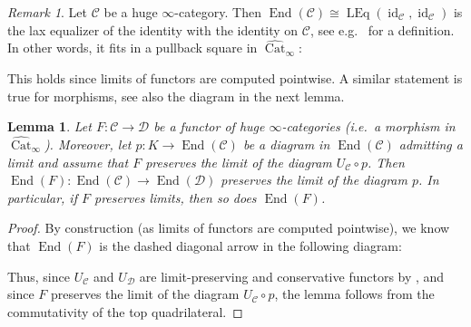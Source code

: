 \documentclass{article}
\theoremstyle{definition}
\theoremstyle{definition}
\theoremstyle{definition}
\theoremstyle{plain}
\newtheorem{lem}[defn]{Lemma}
\theoremstyle{plain}
\theoremstyle{plain}
\theoremstyle{plain}
\theoremstyle{plain}
\theoremstyle{plain}
\theoremstyle{plain}
\theoremstyle{plain}
\theoremstyle{remark}
\newtheorem{rmk}[defn]{Remark}
\theoremstyle{remark}
\theoremstyle{plain}
\theoremstyle{plain}
\theoremstyle{plain}
\theoremstyle{plain}
\theoremstyle{plain}
\newcommand{\id}[1]{\operatorname{id}_{#1}}
\newcommand{\cartsymb}{\arrow[dr, phantom,"\scalebox{1.5}{\color{black}$\lrcorner$}", near start, color=black]}
\newcommand{\Leq}[2]{\operatorname{LEq}(#1,#2)}
\newcommand{\End}[1]{\operatorname{End}(#1)}
\newcommand{\Cat}[1]{\mathcal{#1}}
\newcommand{\Fun}[2]{\operatorname{Fun}({#1},{#2})}
\newcommand{\CatInfHuge}{\widehat{\operatorname{Cat}}_{\infty}}
\begin{document}
\begin{rmk}
    Let $\Cat C$ be a huge $\infty$-category.
    Then $\End{\Cat C} \cong \Leq{\id{\Cat C}}{\id{\Cat C}}$ is
    the lax equalizer of the identity with the identity on $\Cat C$, see e.g.\ \cite[Definition 2.1]{cartmod} for a definition.
    In other words, it fits in a pullback square in $\CatInfHuge$:
    \begin{center}
    \end{center}
    This holds since limits of functors are computed pointwise.
    A similar statement is true for morphisms, see also the diagram in the next lemma.
\end{rmk}

\begin{lem} \label{lem:functoriality:end-limit-preserving}
    Let $F \colon \Cat C \to \Cat D$ be a functor of huge $\infty$-categories (i.e.\ a morphism in $\CatInfHuge$).
    Moreover, let $p\colon K \to \End{\Cat C}$ be a diagram in $\End{\Cat C}$ admitting a limit and assume that $F$ preserves the limit of the diagram $U_{\Cat C} \circ p$.
    Then $\End{F} \colon \End{\Cat C} \to \End{\Cat D}$ preserves the limit of the diagram $p$. 
    In particular, if $F$ preserves limits, then so does $\End{F}$.
\end{lem}
\begin{proof}
    By construction (as limits of functors are computed pointwise),
    we know that $\End{F}$ is the dashed diagonal arrow in the following diagram:
    \begin{center}
    \end{center}
    Thus, since $U_{\Cat C}$ and $U_{\Cat D}$ are limit-preserving and conservative functors by \cite[Proposition 2.6 (b) and (c)]{cartmod},
    and since $F$ preserves the limit of the diagram $U_{\Cat C} \circ p$, the lemma follows from the commutativity of the top quadrilateral.
\end{proof}
\end{document}
